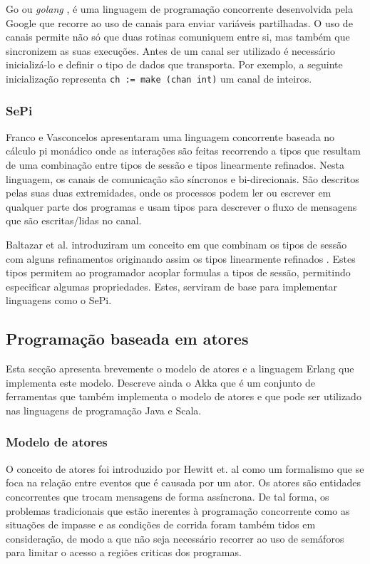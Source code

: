Go ou \textit{golang} \cite{ref-go}, é uma linguagem de programação concorrente desenvolvida pela Google que recorre ao uso de canais para enviar variáveis partilhadas. O uso de canais permite não só que duas rotinas comuniquem entre si, mas também que sincronizem as suas execuções. Antes de um canal ser utilizado é necessário inicializá-lo e definir o tipo de dados que transporta. Por exemplo, a seguinte inicialização representa \lstinline"ch := make (chan int)" um canal de inteiros.

\subsubsection{SePi}
\label{sec:sepi}
\lstset{language=Sepi}
Franco e Vasconcelos \cite{ref-sepi} apresentaram uma linguagem concorrente baseada no cálculo pi monádico onde as interações são feitas recorrendo a tipos que resultam de uma combinação entre tipos de sessão e tipos linearmente refinados.
Nesta linguagem, os canais de comunicação são síncronos e bi-direcionais. São descritos pelas suas duas extremidades, onde os processos podem ler ou escrever em qualquer parte dos programas e usam tipos para descrever o fluxo de mensagens que são escritas/lidas no canal.

Baltazar et al. introduziram um conceito em que combinam os tipos de sessão com alguns refinamentos originando assim os tipos linearmente refinados \cite{ref-lin-ref-st}. Estes tipos permitem ao programador acoplar formulas a tipos de sessão, permitindo especificar algumas propriedades. Estes, serviram de base para implementar linguagens como o SePi.


\subsection{Programação baseada em atores}
\label{sec:actors}
Esta secção apresenta brevemente o modelo de atores e a linguagem Erlang que implementa este modelo. Descreve ainda o Akka que é um conjunto de ferramentas que também implementa o modelo de atores e que pode ser utilizado nas linguagens de programação Java e Scala.

\subsubsection{Modelo de atores}
\label{sec:actors}
O conceito de atores foi introduzido por Hewitt et. al \cite{Hewitt:StructuresAsPatternsOfPassingMessages,Hewitt:ActorFormalismForAI} como um formalismo que se foca na relação entre eventos que é causada por um ator. Os atores são entidades concorrentes que trocam mensagens de forma assíncrona. De tal forma, os problemas tradicionais que estão inerentes à programação concorrente como as situações de impasse e as condições de corrida foram também tidos em consideração, de modo a que não seja necessário recorrer ao uso de semáforos para limitar o acesso a regiões criticas dos programas\cite{Agha:Actors}.

